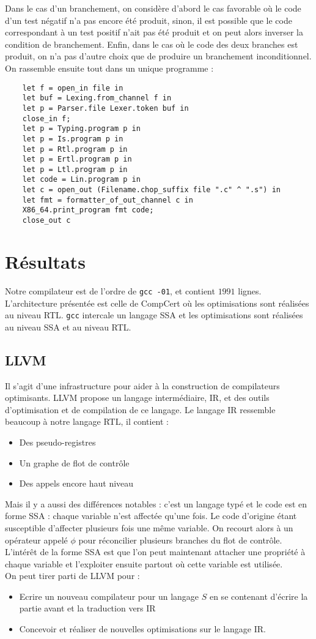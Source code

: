 \documentclass{cours}
\begin{document}
Dans le cas d'un branchement, on considère d'abord le cas favorable où le code d'un test négatif n'a pas encore été produit, sinon, il est possible que le code correspondant à un test positif n'ait pas été produit et on peut alors inverser la condition de branchement. Enfin, dans le cas où le code des deux branches est produit, on n'a pas d'autre choix que de produire un branchement inconditionnel. \\
On rassemble ensuite tout dans un unique programme : 
\begin{verbatim}
    let f = open_in file in
    let buf = Lexing.from_channel f in
    let p = Parser.file Lexer.token buf in
    close_in f;
    let p = Typing.program p in
    let p = Is.program p in
    let p = Rtl.program p in
    let p = Ertl.program p in
    let p = Ltl.program p in
    let code = Lin.program p in
    let c = open_out (Filename.chop_suffix file ".c" ^ ".s") in
    let fmt = formatter_of_out_channel c in
    X86_64.print_program fmt code;
    close_out c
\end{verbatim}

\section{Résultats}
Notre compilateur est de l'ordre de \texttt{gcc -01}, et contient $1991$ lignes. \\
L'architecture présentée est celle de CompCert où les optimisations sont réalisées au niveau RTL. \texttt{gcc} intercale un langage SSA et les optimisations sont réalisées au niveau SSA et au niveau RTL. 
\subsection{LLVM}
Il s'agit d'une infrastructure pour aider à la construction de compilateurs optimisants. LLVM propose un langage intermédiaire, IR, et des outils d'optimisation et de compilation de ce langage. Le langage IR ressemble beaucoup à notre langage RTL, il contient : 
\begin{itemize}
    \item Des pseudo-registres
    \item Un graphe de flot de contrôle
    \item Des appels encore haut niveau
\end{itemize}
Mais il y a aussi des différences notables : c'est un langage typé et le code est en forme SSA : chaque variable n'est affectée qu'une fois. Le code d'origine étant susceptible d'affecter plusieurs fois une même variable. On recourt alors à un opérateur appelé $\phi$ pour réconcilier plusieurs branches du flot de contrôle.\\
L'intérêt de la forme SSA est que l'on peut maintenant attacher une propriété à chaque variable et l'exploiter ensuite partout où cette variable est utilisée. \\

On peut tirer parti de LLVM pour : 
\begin{itemize}
    \item Ecrire un nouveau compilateur pour un langage $S$ en se contenant d'écrire la partie avant et la traduction vers IR
    \item Concevoir et réaliser de nouvelles optimisations sur le langage IR. 
\end{itemize}
\end{document}
